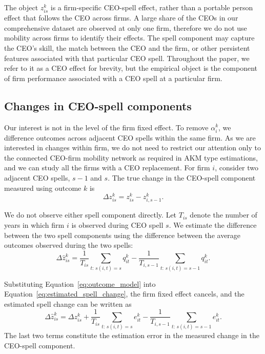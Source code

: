 \documentclass[11pt,a4paper]{article}
\begin{document}
The object $z_{is}^{k}$ is a firm-specific CEO-spell effect, rather than
a portable person effect that follows the CEO across firms. A large share of the CEOs
in our comprehensive dataset are observed at only one firm, therefore we do not use mobility
across firms to identify their effects. The spell component may capture
the CEO's skill, the match between the CEO and the firm, or other
persistent features associated with that particular CEO spell.
Throughout the paper, we refer to it as a CEO effect for
brevity, but the empirical object is the component of firm performance
associated with a CEO spell at a particular firm.


\subsection{Changes in CEO-spell components}
\label{subsec:spell_changes}

Our interest is not in the level of the firm fixed effect. To remove $\alpha_i^{k}$, we difference outcomes across adjacent CEO spells within the same firm. As we are interested in changes within firm, we do not need to restrict our attention only to the connected CEO-firm mobility network as required in AKM type estimations, and we can study all the firms with a CEO replacement. For firm $i$, consider two adjacent CEO spells, $s-1$ and $s$. The
true change in the CEO-spell component measured using outcome $k$ is
\begin{equation}
\Delta z_{is}^{k}
=
z_{is}^{k}
-
z_{i,s-1}^{k}.
\label{eq:true_spell_change}
\end{equation}

We do not observe either spell component directly. Let $T_{is}$
denote the number of years in which firm $i$ is observed during CEO
spell $s$. We estimate the difference between the two spell components
using the difference between the average outcomes observed during the
two spells:
\begin{equation}
\Delta\widehat z_{is}^{k}
=
\frac{1}{T_{is}}
\sum_{t:\,s(i,t)=s}
q_{it}^{k}
-
\frac{1}{T_{i,s-1}}
\sum_{t:\,s(i,t)=s-1}
q_{it}^{k}.
\label{eq:estimated_spell_change}
\end{equation}

Substituting Equation~\eqref{eq:outcome_model} into
Equation~\eqref{eq:estimated_spell_change}, the firm fixed effect
cancels, and the estimated spell change can be written as
\begin{equation}
\Delta\widehat z_{is}^{k}
=
\Delta z_{is}^{k}
+
\frac{1}{T_{is}}
\sum_{t:\,s(i,t)=s}
e_{it}^{k}
-
\frac{1}{T_{i,s-1}}
\sum_{t:\,s(i,t)=s-1}
e_{it}^{k}.
\label{eq:spell_change_error}
\end{equation}
The last two terms constitute the estimation error in the measured
change in the CEO-spell component.
\end{document}
